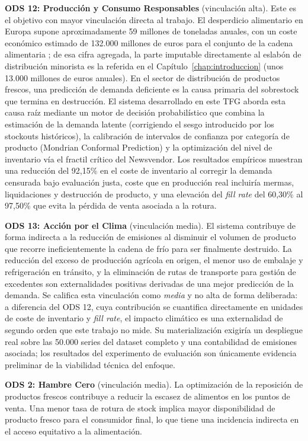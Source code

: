 \textbf{ODS 12: Producción y Consumo Responsables} (vinculación alta). Este es el objetivo con mayor vinculación directa al trabajo. El desperdicio alimentario en Europa supone aproximadamente 59 millones de toneladas anuales, con un coste económico estimado de 132.000 millones de euros para el conjunto de la cadena alimentaria \cite{eucommission2023foodwaste}; de esa cifra agregada, la parte imputable directamente al eslabón de distribución minorista es la referida en el Capítulo~\ref{chap:introduccion} (unos 13.000 millones de euros anuales). En el sector de distribución de productos frescos, una predicción de demanda deficiente es la causa primaria del sobrestock que termina en destrucción. El sistema desarrollado en este TFG aborda esta causa raíz mediante un motor de decisión probabilístico que combina la estimación de la demanda latente (corrigiendo el sesgo introducido por los stockouts históricos), la calibración de intervalos de confianza por categoría de producto (Mondrian Conformal Prediction) y la optimización del nivel de inventario vía el fractil crítico del Newsvendor. Los resultados empíricos muestran una reducción del 92{,}15\% en el coste de inventario al corregir la demanda censurada bajo evaluación justa, coste que en producción real incluiría mermas, liquidaciones y destrucción de producto, y una elevación del \textit{fill rate} del 60{,}30\% al 97{,}50\% que evita la pérdida de venta asociada a la rotura.

\textbf{ODS 13: Acción por el Clima} (vinculación media). El sistema contribuye de forma indirecta a la reducción de emisiones al disminuir el volumen de producto que recorre ineficientemente la cadena de frío para ser finalmente destruido. La reducción del exceso de producción agrícola en origen, el menor uso de embalaje y refrigeración en tránsito, y la eliminación de rutas de transporte para gestión de excedentes son externalidades positivas derivadas de una mejor predicción de la demanda. Se califica esta vinculación como \emph{media} y no alta de forma deliberada: a diferencia del ODS 12, cuya contribución se cuantifica directamente en unidades de coste de inventario y \textit{fill rate}, el impacto climático es una externalidad de segundo orden que este trabajo no mide. Su materialización exigiría un despliegue real sobre las 50.000 series del dataset completo y una contabilidad de emisiones asociada; los resultados del experimento de evaluación son únicamente evidencia preliminar de la viabilidad técnica del enfoque.

\textbf{ODS 2: Hambre Cero} (vinculación media). La optimización de la reposición de productos frescos contribuye a reducir la escasez de alimentos en los puntos de venta. Una menor tasa de rotura de stock implica mayor disponibilidad de producto fresco para el consumidor final, lo que tiene una incidencia indirecta en el acceso equitativo a la alimentación.

